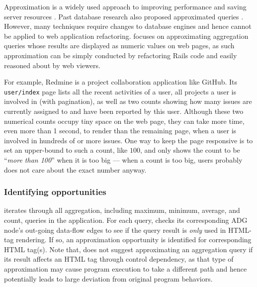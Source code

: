 Approximation is a widely used approach to improving performance and saving server resources \cite{farrell2016meantime}. 
Past database research also proposed approximated
queries \cite{motwani:cidr03:query}. However, many techniques require 
changes to database engines \cite{ioannidis:vldb99:histogram} and hence
cannot be applied to web application refactoring. \Tool focuses on approximating
aggregation queries whose results are displayed as numeric values on web pages,
as such approximation can be simply conducted by refactoring Rails code
and easily reasoned about by web viewers.

For example, 
Redmine \cite{redmine} is a project collaboration application like GitHub. Its  {\tt user/index} page
lists all the recent activities of a user, all projects a user is involved in (with pagination), 
as well as two 
counts showing how many issues are currently assigned to and have been reported by 
this user.
Although these two numerical counts occupy tiny space on the web page,
they can take more time, even more than 1 second, to render than the remaining page,
when a user is involved in hundreds of or more issues. 
One way to keep the page responsive is to set an upper-bound to such a count, like $100$, and only
shows the count to be ``{\it more than 100}'' when it is too big --- when a count is too big,
 users probably does not care about the exact number anyway.

\subsubsection{Identifying opportunities}
\Tool iterates through all aggregation, including
maximum, minimum, average, and count,
queries in the application. 
For each query, \Tool checks its corresponding ADG node's
out-going data-flow edges to
see if the query result is {\it only} used in
HTML-tag rendering. 
If so, an approximation opportunity is
identified for corresponding HTML tag(s). 
Note that, \Tool does not suggest approximating an aggregation query if its result affects
an HTML tag through control dependency, as that type of approximation may
cause program execution to take a different path and hence potentially leads
to large deviation from original program behaviors. 


